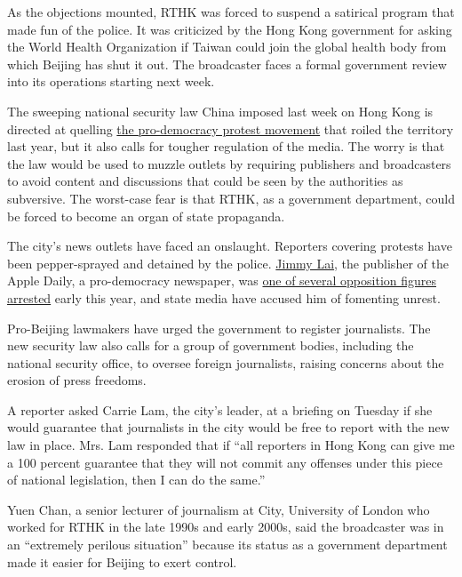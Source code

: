 As the objections mounted, RTHK was forced to suspend a satirical
program that made fun of the police. It was criticized by the Hong Kong
government for asking the World Health Organization if Taiwan could join
the global health body from which Beijing has shut it out. The
broadcaster faces a formal government review into its operations
starting next week.

The sweeping national security law China imposed last week on Hong Kong
is directed at quelling
\href{https://www.nytimes.com/2020/06/09/world/asia/hong-kong-protests-one-year-later.html}{the
pro-democracy protest movement} that roiled the territory last year, but
it also calls for tougher regulation of the media. The worry is that the
law would be used to muzzle outlets by requiring publishers and
broadcasters to avoid content and discussions that could be seen by the
authorities as subversive. The worst-case fear is that RTHK, as a
government department, could be forced to become an organ of state
propaganda.

The city's news outlets have faced an onslaught. Reporters covering
protests have been pepper-sprayed and detained by the police.
\href{https://www.nytimes.com/2019/08/23/world/asia/jimmy-lai-hong-kong-protests.html}{Jimmy
Lai}, the publisher of the Apple Daily, a pro-democracy newspaper, was
\href{https://www.nytimes.com/2020/02/28/world/asia/jimmy-lai-hong-kong-arrested.html}{one
of several opposition figures arrested} early this year, and state media
have accused him of fomenting unrest.

Pro-Beijing lawmakers have urged the government to register journalists.
The new security law also calls for a group of government bodies,
including the national security office, to oversee foreign journalists,
raising concerns about the erosion of press freedoms.

A reporter asked Carrie Lam, the city's leader, at a briefing on Tuesday
if she would guarantee that journalists in the city would be free to
report with the new law in place. Mrs. Lam responded that if ``all
reporters in Hong Kong can give me a 100 percent guarantee that they
will not commit any offenses under this piece of national legislation,
then I can do the same.''

Yuen Chan, a senior lecturer of journalism at City, University of London
who worked for RTHK in the late 1990s and early 2000s, said the
broadcaster was in an ``extremely perilous situation'' because its
status as a government department made it easier for Beijing to exert
control.

